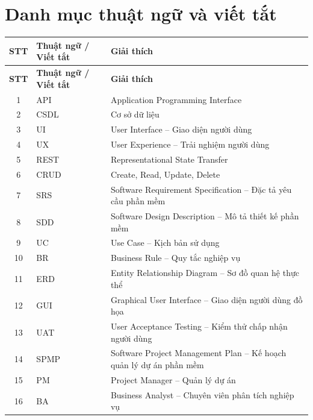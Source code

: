 
\chapter*{Danh mục thuật ngữ và viết tắt}

\renewcommand{\arraystretch}{1.3}
\begin{longtable}{|c|l|p{9.5cm}|}
    \hline
    \rowcolor{navyblue!15}
    \textbf{STT} & \textbf{Thuật ngữ / Viết tắt} & \textbf{Giải thích} \\
    \hline
    \endfirsthead

    \hline
    \rowcolor{navyblue!15}
    \textbf{STT} & \textbf{Thuật ngữ / Viết tắt} & \textbf{Giải thích} \\
    \hline
    \endhead

    1 & API & Application Programming Interface \\
    \hline
    2 & CSDL & Cơ sở dữ liệu \\
    \hline
    3 & UI & User Interface -- Giao diện người dùng \\
    \hline
    4 & UX & User Experience -- Trải nghiệm người dùng \\
    \hline
    5 & REST & Representational State Transfer \\
    \hline
    6 & CRUD & Create, Read, Update, Delete \\
    \hline
    7 & SRS & Software Requirement Specification -- Đặc tả yêu cầu phần mềm \\
    \hline
    8 & SDD & Software Design Description -- Mô tả thiết kế phần mềm \\
    \hline
    9 & UC & Use Case -- Kịch bản sử dụng \\
    \hline
    10 & BR & Business Rule -- Quy tắc nghiệp vụ \\
    \hline
    11 & ERD & Entity Relationship Diagram -- Sơ đồ quan hệ thực thể \\
    \hline
    12 & GUI & Graphical User Interface -- Giao diện người dùng đồ họa \\
    \hline
    13 & UAT & User Acceptance Testing -- Kiểm thử chấp nhận người dùng \\
    \hline
    14 & SPMP & Software Project Management Plan -- Kế hoạch quản lý dự án phần mềm \\
    \hline
    15 & PM & Project Manager -- Quản lý dự án \\
    \hline
    16 & BA & Business Analyst -- Chuyên viên phân tích nghiệp vụ \\
    \hline

\end{longtable}
\renewcommand{\arraystretch}{1.0}
